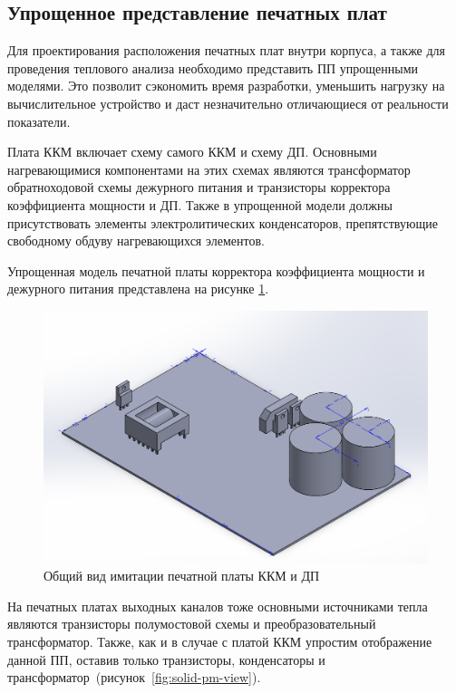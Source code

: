 \documentclass[utf8x, 14pt, oneside, a4paper]{article}
\begin{document}
		\subsection{Упрощенное представление печатных плат}
		
		Для проектирования расположения печатных плат внутри корпуса, а также для проведения теплового анализа необходимо представить ПП упрощенными моделями. Это позволит сэкономить время разработки, уменьшить нагрузку на вычислительное устройство и даст незначительно отличающиеся от реальности показатели.
		
		Плата ККМ включает схему самого ККМ и схему ДП. Основными нагревающимися компонентами на этих схемах являются трансформатор обратноходовой схемы дежурного питания и транзисторы корректора коэффициента мощности и ДП. Также в упрощенной модели должны присутствовать элементы электролитических конденсаторов, препятствующие свободному обдуву нагревающихся элементов.
		
		Упрощенная модель печатной платы корректора коэффициента мощности и дежурного питания представлена на рисунке \ref{fig:solid-kkm-view}.
		
		\begin{figure}[H]
			\centering
			\includegraphics[width=0.9\linewidth]{"Рисунки/Solid-kkm-view"}
			\caption{Общий вид имитации печатной платы ККМ и ДП}
			\label{fig:solid-kkm-view}
		\end{figure}	
		
		На печатных платах выходных каналов тоже основными источниками тепла являются транзисторы полумостовой схемы и преобразовательный трансформатор. Также, как и в случае с платой ККМ упростим отображение данной ПП, оставив только транзисторы, конденсаторы и трансформатор~(рисунок~\ref{fig:solid-pm-view}).
		
\end{document}
